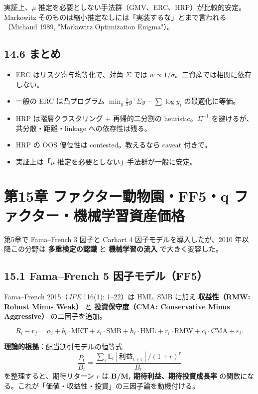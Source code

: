 \documentclass[11pt,a4paper]{report}
\begin{document}
実証上、$\mu$ 推定を必要としない手法群（GMV、ERC、HRP）が比較的安定。Markowitz そのものは縮小推定なしには「実装するな」とまで言われる（Michaud 1989, "Markowitz Optimization Enigma"）。

\section{14.6 まとめ}

\begin{itemize}
\item ERC はリスク寄与均等化で、対角 $\Sigma$ では $w \propto 1/\sigma$。二資産では相関に依存しない。
\item 一般の ERC は凸プログラム $\min_y \tfrac{1}{2} y^\top \Sigma y - \sum \log y_i$ の最適化に等価。
\item HRP は階層クラスタリング + 再帰的二分割の heuristic。$\Sigma^{-1}$ を避けるが、共分散・距離・linkage への依存性は残る。
\item HRP の OOS 優位性は contested。教えるなら caveat 付きで。
\item 実証上は「$\mu$ 推定を必要としない」手法群が一般に安定。
\end{itemize}

\noindent\hrulefill

\chapter{第15章 ファクター動物園・FF5・q ファクター・機械学習資産価格}

第5章で Fama–French 3 因子と Carhart 4 因子モデルを導入したが、2010 年以降この分野は \textbf{多重検定の認識} と \textbf{機械学習の流入} で大きく変容した。

\section{15.1 Fama–French 5 因子モデル（FF5）}

Fama–French 2015（\emph{JFE} 116(1): 1–22）は HML, SMB に加え \textbf{収益性（RMW: Robust Minus Weak）} と \textbf{投資保守度（CMA: Conservative Minus Aggressive）} の二因子を追加。

\[ R_i - r_f = \alpha_i + b_i \cdot \mathrm{MKT} + s_i \cdot \mathrm{SMB} + h_i \cdot \mathrm{HML} + r_i \cdot \mathrm{RMW} + c_i \cdot \mathrm{CMA} + \varepsilon_i. \]

\textbf{理論的根拠}：配当割引モデルの恒等式 \[ \frac{P_t}{B_t} = \frac{\sum_\tau \mathbb{E}_t[\text{利益}_{t+\tau}]/(1 + r)^\tau}{B_t} \] を整理すると、期待リターン $r$ は \textbf{B/M, 期待利益、期待投資成長率} の関数になる。これが「価値・収益性・投資」の三因子論を動機付ける。
\end{document}
